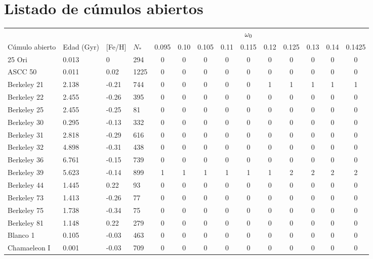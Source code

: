 \newpage
{}
\recalctypearea
\chapter{Listado de cúmulos abiertos}\label{ap:apendice1}

\begin{longtable}[c]{|l l l l || c c c c c c c c c c|} 
		\hline
		& & & & & & & & $\omega_{\mathrm{0}}$ & & & & & \\
		Cúmulo abierto & Edad (Gyr) & [Fe/H] & $N_*$ & 0.095 & 0.10 & 0.105 & 0.11 & 0.115 & 0.12 & 0.125 & 0.13 & 0.14 & 0.1425\\
		\hline
		25 Ori & 0.013 & 0 & 294 & 0 & 0 & 0 & 0 & 0 & 0 & 0 & 0 & 0 & 0\\
		ASCC 50 & 0.011 & 0.02 & 1225 & 0 & 0 & 0 & 0 & 0 & 0 & 0 & 0 & 0 & 0\\
		\rowcolor{lightgray}
		Berkeley 21 & 2.138 & -0.21 & 744 & 0 & 0 & 0 & 0 & 0 & 1 & 1 & 1 & 1 & 1\\
		Berkeley 22 & 2.455 & -0.26 & 395 & 0 & 0 & 0 & 0 & 0 & 0 & 0 & 0 & 0 & 0\\
		Berkeley 25 & 2.455 & -0.25 & 81 & 0 & 0 & 0 & 0 & 0 & 0 & 0 & 0 & 0 & 0\\
		Berkeley 30 & 0.295 & -0.13 & 332 & 0 & 0 & 0 & 0 & 0 & 0 & 0 & 0 & 0 & 0\\
		Berkeley 31 & 2.818 & -0.29 & 616 & 0 & 0 & 0 & 0 & 0 & 0 & 0 & 0 & 0 & 0\\
		Berkeley 32 & 4.898 & -0.31 & 438 & 0 & 0 & 0 & 0 & 0 & 0 & 0 & 0 & 0 & 0\\
		Berkeley 36 & 6.761 & -0.15 & 739 & 0 & 0 & 0 & 0 & 0 & 0 & 0 & 0 & 0 & 0\\
		\rowcolor{lightgray}
		Berkeley 39 & 5.623 & -0.14 & 899 & 1 & 1 & 1 & 1 & 1 & 1 & 2 & 2 & 2 & 2\\
		Berkeley 44 & 1.445 & 0.22 & 93 & 0 & 0 & 0 & 0 & 0 & 0 & 0 & 0 & 0 & 0\\
		Berkeley 73 & 1.413 & -0.26 & 77 & 0 & 0 & 0 & 0 & 0 & 0 & 0 & 0 & 0 & 0\\
		Berkeley 75 & 1.738 & -0.34 & 75 & 0 & 0 & 0 & 0 & 0 & 0 & 0 & 0 & 0 & 0\\
		Berkeley 81 & 1.148 & 0.22 & 279 & 0 & 0 & 0 & 0 & 0 & 0 & 0 & 0 & 0 & 0\\
		Blanco 1 & 0.105 & -0.03 & 463 & 0 & 0 & 0 & 0 & 0 & 0 & 0 & 0 & 0 & 0\\
		Chamaeleon I & 0.001 & -0.03 & 709 & 0 & 0 & 0 & 0 & 0 & 0 & 0 & 0 & 0 & 0\\

\end{longtable}
